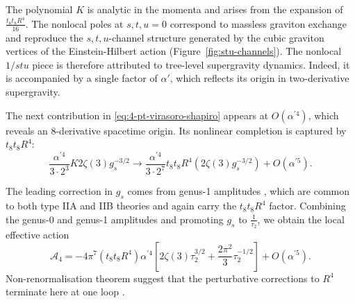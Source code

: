 The polynomial $K$ is analytic in the momenta and arises from the expansion of $\frac{t_8 t_8 R^4}{16}$.
The nonlocal poles at $s, t, u = 0$ correspond to massless graviton exchange and reproduce the $s,t,u$-channel structure generated by the cubic graviton vertices of the Einstein-Hilbert action (Figure~\ref{fig:stu-channels}). The nonlocal $1/stu$ piece is therefore attributed to tree-level supergravity dynamics.
Indeed, it is accompanied by a single factor of $\alpha'$, which reflects its origin in two-derivative supergravity.

The next contribution in \eqref{eq:4-pt-virasoro-shapiro} appears at $O(\alpha^{\prime 4})$, which reveals an 8-derivative spacetime origin.
Its nonlinear completion is captured by $t_8t_8 R^4$:
\begin{equation}
\frac{\alpha^{\prime 4}}{3 \cdot 2^3} K 2 \zeta(3) g_s^{-3/2}
\to
\frac{\alpha^{\prime 4}}{3 \cdot 2^7} t_8t_8 R^4 (2 \zeta(3) g_s^{-3/2}) + O(\alpha^{\prime 5}).
\end{equation}

The leading correction in $g_s$ comes from genus-1 amplitudes \cite{Green:1999pv}, which are common to both type IIA and IIB theories and again carry the $t_8 t_8 R^4$ factor. 
Combining the genus-0 and genus-1 amplitudes and promoting $g_s$ to $\frac{1}{\tau_2}$, we obtain the local effective action
\begin{equation}
\mathcal{A}_4 = -4\pi^7 (t_8 t_8 R^4)\alpha^{\prime 4}
\left[
2 \zeta(3)\tau_2^{3/2}
+\frac{2\pi^2}{3}\tau_2^{-1/2}
\right]
+O(\alpha^{\prime 5}).
\label{eq:genus-0-genus-1-R4}
\end{equation}
Non-renormalisation theorem suggest that the perturbative corrections to $R^4$ terminate here at one loop \cite{Green:1997tv,Kehagias:1997cq}.

